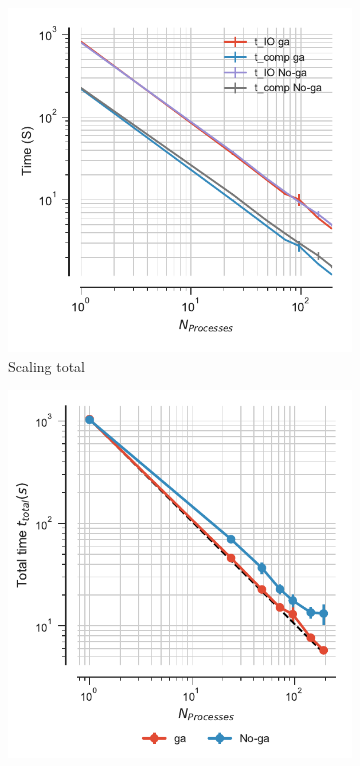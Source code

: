 \begin{figure}[ht!]
\centering
\begin{subfigure}{.3\textwidth}
  \includegraphics[width=\linewidth]{figures/Comparison_IO_compute_scaling_traj_splitting.pdf}
  \caption{Scaling total}
  \label{fig:ScalingComputeIO-split}
\end{subfigure}
\hfill
\begin{subfigure}{.3\textwidth}
  \includegraphics[width=\linewidth]{figures/Comparison_tot_time_traj_splitting.pdf}

\end{subfigure}
\end{figure}

